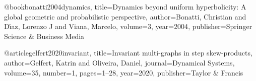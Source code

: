 @book{bonatti2004dynamics,  
 title={Dynamics beyond uniform hyperbolicity: A global geometric and probabilistic perspective},   
author={Bonatti, Christian and D{\'\i}az, Lorenzo J and Viana, Marcelo},   
volume={3},  
 year={2004},  
  publisher={Springer Science \& Business Media} } 
  
  @article{gelfert2020invariant,  
   title={Invariant multi-graphs in step skew-products}, 
   author={Gelfert, Katrin and Oliveira, Daniel},  
  journal={Dynamical Systems},   
  volume={35},  
   number={1},  
    pages={1--28},   
    year={2020},  
     publisher={Taylor \& Francis} } 